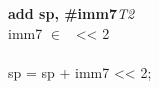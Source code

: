 


\begin{instructionblock}{\imagewidth}%
    \textbf{add sp, \#imm7}\hfill\textit{T2}\\
    imm7 $\in$ \immSeven\ {<}{<} 2\\
    {}\\
    sp = sp + imm7 {<}{<} 2;
\end{instructionblock}

